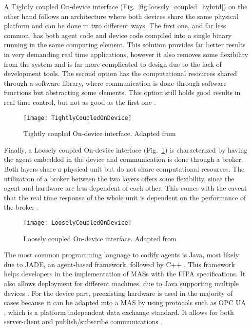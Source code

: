 A Tightly coupled On-device interface (Fig.~\ref{fig:loosely_coupled_hybrid}) on the other hand follows an architecture where both devices share the same physical platform and can be done in two different ways. The first one, and far less common, has both agent code and device code compiled into a single binary running in the same computing element. This solution provides far better results in very demanding real time applications, however it also removes some flexibility from the system and is far more complicated to design due to the lack of development tools. The second option has the computational resources shared through a software library, where communication is done through software functions but abstracting some elements. This option still holds good results in real time control, but not as good as the first one \cite{8591641}.\\

\begin{figure}[hbt!]
	\centering
	\texttt{[image: TightlyCoupledOnDevice]}
	\caption{Tightly coupled On-device interface. Adapted from \cite{8591641}}
	\label{fig:tightly_coupled_ondevice}
\end{figure}

Finally, a Loosely coupled On-device interface (Fig.~\ref{fig:tightly_coupled_ondevice}) is characterized by having the agent embedded in the device and communication is done through a broker. Both layers share a physical unit but do not share computational resources. The utilization of a broker between the two layers offers some flexibility, since the agent and hardware are less dependent of each other. This comes with the caveat that the real time response of the whole unit is dependent on the performance of the broker \cite{8591641}.

\begin{figure}[hbt!]
	\centering
	\texttt{[image: LooselyCoupledOnDevice]}
	\caption{Loosely coupled On-device interface. Adapted from \cite{8591641}}
	\label{fig:loosely_coupled_ondevice}
\end{figure}


The most common programming language to codify agents is Java, most likely due to JADE, an agent-based framework, followed by C++ \cite{8591641}. This framework helps developers in the implementation of MASs  with the FIPA specifications. It also allows deployment for different machines, due to Java supporting multiple devices \cite{JADE_website}.
For the device part, preexisting hardware is used in the majority of cases because it can be adapted into a MAS by using protocols such as OPC UA \cite{8591641}, which is a platform independent data exchange standard. It allows for both server-client and publish/subscribe communications \cite{OPCUA_website}.



